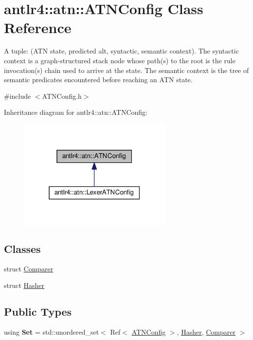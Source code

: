 \hypertarget{classantlr4_1_1atn_1_1ATNConfig}{}\section{antlr4\+:\+:atn\+:\+:A\+T\+N\+Config Class Reference}
\label{classantlr4_1_1atn_1_1ATNConfig}


A tuple\+: (A\+TN state, predicted alt, syntactic, semantic context). The syntactic context is a graph-\/structured stack node whose path(s) to the root is the rule invocation(s) chain used to arrive at the state. The semantic context is the tree of semantic predicates encountered before reaching an A\+TN state.  




{\ttfamily \#include $<$A\+T\+N\+Config.\+h$>$}



Inheritance diagram for antlr4\+:\+:atn\+:\+:A\+T\+N\+Config\+:
\nopagebreak
\begin{figure}[H]
\begin{center}
\leavevmode
\includegraphics[width=219pt]{classantlr4_1_1atn_1_1ATNConfig__inherit__graph}
\end{center}
\end{figure}
\subsection*{Classes}
\begin{DoxyCompactItemize}
\item 
struct \hyperlink{structantlr4_1_1atn_1_1ATNConfig_1_1Comparer}{Comparer}
\item 
struct \hyperlink{structantlr4_1_1atn_1_1ATNConfig_1_1Hasher}{Hasher}
\end{DoxyCompactItemize}
\subsection*{Public Types}
\begin{DoxyCompactItemize}
\item 
\mbox{\label{classantlr4_1_1atn_1_1ATNConfig_a8b8a460058db3442824bc69cec6ed54b}} 
using {\bfseries Set} = std\+::unordered\+\_\+set$<$ Ref$<$ \hyperlink{classantlr4_1_1atn_1_1ATNConfig}{A\+T\+N\+Config} $>$, \hyperlink{structantlr4_1_1atn_1_1ATNConfig_1_1Hasher}{Hasher}, \hyperlink{structantlr4_1_1atn_1_1ATNConfig_1_1Comparer}{Comparer} $>$
\end{DoxyCompactItemize}
